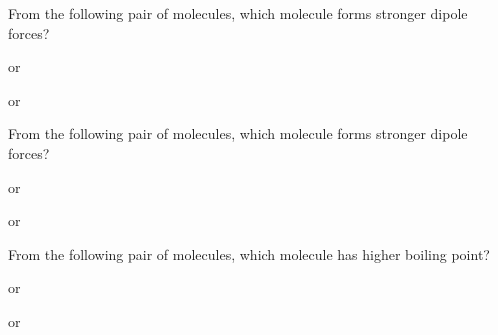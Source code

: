\documentclass[main.tex]{subfiles}
\begin{document}
\begin{multicols*}{2}
\begin{question}[ID=\the\value{numA}]
From the following pair of molecules, which molecule forms stronger dipole forces?
\begin{inparaenum}[(a)]
\item {} or 
\item  {} or  
\end{inparaenum}
\end{question}
\begin{solution}
\begin{inparaenum}[(a)]
\item  {}
\item {} 
\end{inparaenum}\hspace{0.1cm}\end{solution}
\begin{question}[ID=\the\value{numA}]
From the following pair of molecules, which molecule forms stronger dipole forces?
\begin{inparaenum}[(a)]
\item {} or 
\item  {} or  
\end{inparaenum}
\end{question}
\begin{solution}
\begin{inparaenum}[(a)]
\item  {}
\item {} 
\end{inparaenum}\hspace{0.1cm}\end{solution}


\begin{question}[ID=\the\value{numA}]
From the following pair of molecules, which molecule has higher boiling point?
\begin{inparaenum}[(a)]
\item    {}  or   
\item     {}  or   
\end{inparaenum}
\end{question}
\begin{solution}
\begin{inparaenum}[(a)]
\item {}
\item	 {}
\end{inparaenum}\hspace{0.1cm}\end{solution}


\end{multicols*}
\end{document}
